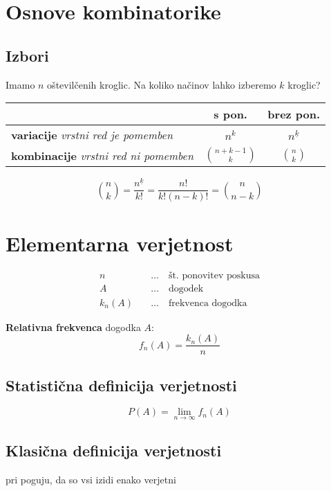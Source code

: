 
 

\begin{multicols}{4}
\setlength{\premulticols}{1pt}
\setlength{\postmulticols}{1pt}
\setlength{\multicolsep}{1pt}
\setlength{\columnsep}{2pt}

\section{Osnove kombinatorike}
\subsection*{Izbori}
Imamo $n$ oštevilčenih kroglic. Na koliko načinov lahko izberemo $k$ kroglic?

\begin{center}
    \begin{tabular}{ m{6em} | c | c | } 
         & \textbf{s pon.} & \textbf{brez pon.}\\ 
        \hline
        \textbf{variacije} \emph{vrstni red je pomemben} & $n^k$ & $n^{\underline{k}}$ \\ 
        \hline
        \textbf{kombinacije} \emph{vrstni red ni pomemben} & $\binom{n+k-1}{k}$ & $\binom{n}{k}$ \\ 
    \end{tabular}
\end{center}

\[\binom{n}{k} = \frac{n^{\underline{k}}}{k!} = \frac{n!}{k!(n-k)!} = \binom{n}{n-k}\]

\section{Elementarna verjetnost}
\begin{align*}
	n \quad & \dots \quad \text{št. ponovitev poskusa} \\
	A \quad & \dots \quad \text{dogodek} \\
	k_n(A) \quad & \dots \quad \text{frekvenca dogodka}
\end{align*}

\textbf{Relativna frekvenca} dogodka $A$:
\[ f_n(A) = \frac{k_n(A)}{n} \]

\subsection{Statistična definicija verjetnosti}
\[ P(A) = \lim_{n \to \infty} f_n(A) \]

\subsection{Klasična definicija verjetnosti}
pri poguju, da so vsi izidi enako verjetni


\end{multicols}

